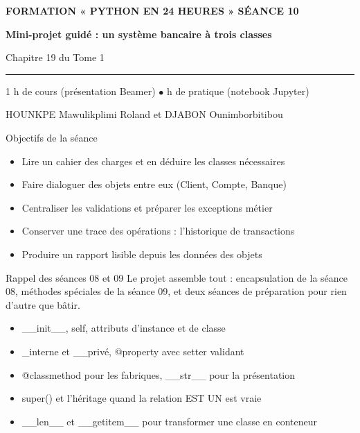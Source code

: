 \documentclass[aspectratio=169,11pt]{beamer}
\begin{document}
{%
\begin{frame}[plain]
\vspace{10mm}
{\color{PyJaune}\small\bfseries FORMATION « PYTHON EN 24 HEURES » \quad\textbar\quad SÉANCE 10\par}
\vspace{4mm}
{\color{white}\Huge\bfseries Mini-projet guidé : un système bancaire à trois classes\par}
\vspace{4mm}
{\color{PyBleuClair}\large Chapitre 19 du Tome 1\par}
\vspace{7mm}
{\color{PyJaune}\rule{34mm}{2.2pt}\par}
\vspace{7mm}
{\color{white}\normalsize 1 h de cours (présentation Beamer) \quad$\bullet$ h de pratique (notebook Jupyter)\par}
\vspace{2.5mm}
{\color{PyBleuClair}\normalsize HOUNKPE Mawulikplimi Roland et DJABON Ounimborbitibou\par}
\end{frame}
}
\begin{frame}{Objectifs de la séance}
\begin{itemize}
  \item Lire un cahier des charges et en déduire les classes nécessaires
  \item Faire dialoguer des objets entre eux (Client, Compte, Banque)
  \item Centraliser les validations et préparer les exceptions métier
  \item Conserver une trace des opérations : l'historique de transactions
  \item Produire un rapport lisible depuis les données des objets
\end{itemize}
\end{frame}
\begin{frame}{Rappel des séances 08 et 09}
Le projet assemble tout : encapsulation de la séance 08, méthodes spéciales de la séance 09, et deux séances de préparation pour rien d'autre que bâtir.

\begin{itemize}
  \item \_\_init\_\_, self, attributs d'instance et de classe
  \item \_interne et \_\_privé, @property avec setter validant
  \item @classmethod pour les fabriques, \_\_str\_\_ pour la présentation
  \item super() et l'héritage quand la relation EST UN est vraie
  \item \_\_len\_\_ et \_\_getitem\_\_ pour transformer une classe en conteneur
\end{itemize}
\end{frame}
\end{document}

